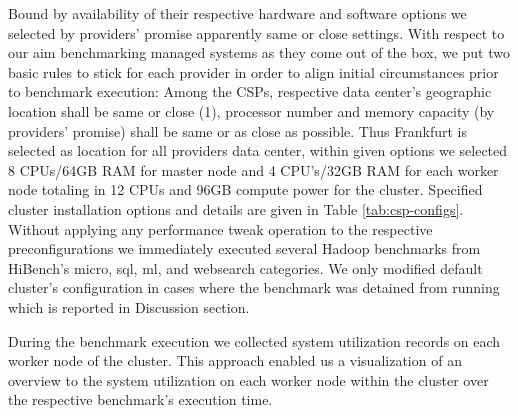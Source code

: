 \documentclass[review]{elsarticle}
\begin{document}
Bound by availability of their respective hardware and software options we selected by providers' promise apparently same or close settings. With respect to our aim benchmarking managed systems as they come out of the box, we put two basic rules to stick for each provider in order to align initial circumstances prior to benchmark execution: Among the CSPs, respective  data center's geographic location shall be same or close (1), processor number and memory capacity (by providers' promise) shall be same or as close as possible. Thus Frankfurt is selected as location for all providers data center, within given options we selected 8 CPUs/64GB RAM for master node and 4 CPU's/32GB RAM for each worker node totaling in 12 CPUs and 96GB compute power for the cluster. Specified cluster installation options and details are given in Table \ref{tab:csp-configs}. Without applying any performance tweak operation to the respective preconfigurations we immediately executed several Hadoop benchmarks from HiBench's micro, sql, ml, and websearch categories. We only modified default cluster's configuration in cases where the benchmark was detained from running which is reported in Discussion section.

During the benchmark execution we collected system utilization records on each worker node of the cluster. This approach enabled us a visualization of an overview to the system utilization on each worker node within the cluster over the respective benchmark's execution time. 
\end{document}

